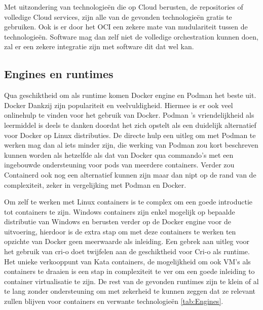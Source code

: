 Met uitzondering van technologieën die op Cloud berusten, de repositories of volledige Cloud services, zijn alle van de gevonden technologieën gratis te gebruiken. Ook is er door het OCI een zekere mate van mudulariteit tussen de technologieën. Software mag dan zelf niet de volledige orchestration kunnen doen, zal er een zekere integratie zijn met software dit dat wel kan.

\subsection{Engines en runtimes}
Qua geschiktheid om als runtime komen Docker engine en Podman het beste uit. Docker Dankzij zijn populariteit en veelvuldigheid. Hiermee is er ook veel onlinehulp te vinden voor het gebruik van Docker. Podman ’s vriendelijkheid als leermiddel is deels te danken doordat het zich opstelt als een duidelijk alternatief voor Docker op Linux distributies. De directe hulp een uitleg om met Podman te werken mag dan al iets minder zijn, die werking van Podman zou kort beschreven kunnen worden als hetzelfde als dat van Docker qua commando’s met een ingebouwde ondersteuning voor pods van meerdere containers.  Verder zou Containerd ook nog een alternatief kunnen zijn maar dan nipt op de rand van de complexiteit, zeker in vergelijking met Podman en Docker.

Om zelf te werken met Linux containers is te complex om een goede introductie tot containers te zijn. Windows containers zijn enkel mogelijk op bepaalde distributie van Windows en berusten verder op de Docker engine voor de uitvoering, hierdoor is de extra stap om met deze containers te werken ten opzichte van Docker geen meerwaarde als inleiding. Een gebrek aan uitleg voor het gebruik van cri-o doet twijfelen aan de geschiktheid voor Cri-o als runtime.  Het unieke verkooppunt van Kata containers, de mogelijkheid om ook VM’s als containers te draaien is een stap in complexiteit te ver om een goede inleiding to container virtualisatie te zijn.  De rest van de gevonden runtimes zijn te klein of al te lang zonder ondersteuning om met zekerheid te kunnen zeggen dat ze relevant zullen blijven voor containers en verwante technologieën \ref{tab:Engines}. 

